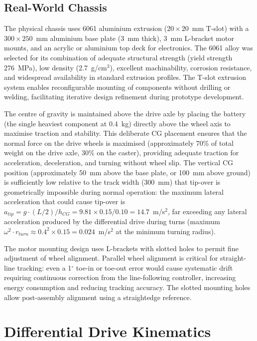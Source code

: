 \documentclass[12pt,a4paper,oneside]{report}
\begin{document}
\subsection{Real-World Chassis}

The physical chassis uses 6061 aluminium extrusion ($20 \times 20$~mm T-slot) with a $300 \times 250$~mm aluminium base plate (3~mm thick), 3~mm L-bracket motor mounts, and an acrylic or aluminium top deck for electronics. The 6061 alloy was selected for its combination of adequate structural strength (yield strength 276~MPa), low density (2.7~g/cm$^3$), excellent machinability, corrosion resistance, and widespread availability in standard extrusion profiles. The T-slot extrusion system enables reconfigurable mounting of components without drilling or welding, facilitating iterative design refinement during prototype development.

The centre of gravity is maintained above the drive axle by placing the battery (the single heaviest component at 0.4~kg) directly above the wheel axis to maximise traction and stability. This deliberate CG placement ensures that the normal force on the drive wheels is maximised (approximately 70\% of total weight on the drive axle, 30\% on the caster), providing adequate traction for acceleration, deceleration, and turning without wheel slip. The vertical CG position (approximately 50~mm above the base plate, or 100~mm above ground) is sufficiently low relative to the track width (300~mm) that tip-over is geometrically impossible during normal operation: the maximum lateral acceleration that could cause tip-over is $a_{tip} = g \cdot (L/2)/h_{CG} = 9.81 \times 0.15/0.10 = 14.7$~m/s$^2$, far exceeding any lateral acceleration produced by the differential drive during turns (maximum $\omega^2 \cdot r_{turn} \approx 0.4^2 \times 0.15 = 0.024$~m/s$^2$ at the minimum turning radius).

The motor mounting design uses L-brackets with slotted holes to permit fine adjustment of wheel alignment. Parallel wheel alignment is critical for straight-line tracking: even a 1$^{\circ}$ toe-in or toe-out error would cause systematic drift requiring continuous correction from the line-following controller, increasing energy consumption and reducing tracking accuracy. The slotted mounting holes allow post-assembly alignment using a straightedge reference.

\section{Differential Drive Kinematics}
\end{document}
